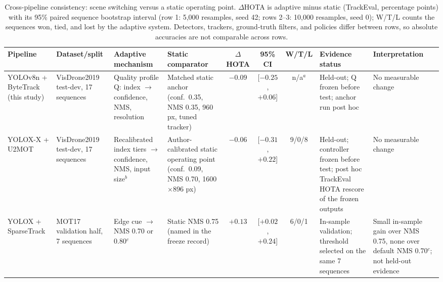 \begin{table}[t]
\centering
\caption{Cross-pipeline consistency: scene switching versus a static operating point. $\Delta$HOTA is adaptive minus static (TrackEval, percentage points) with its 95\% paired sequence bootstrap interval (row 1: 5,000 resamples, seed 42; rows 2--3: 10,000 resamples, seed 0); W/T/L counts the sequences won, tied, and lost by the adaptive system. Detectors, trackers, ground-truth filters, and policies differ between rows, so absolute accuracies are not comparable across rows.}
\label{tab:crosspipe}
\footnotesize
\setlength\tabcolsep{3pt}
\begin{tabular}{>{\raggedright\arraybackslash}p{1.6cm}>{\raggedright\arraybackslash}p{1.75cm}>{\raggedright\arraybackslash}p{1.9cm}>{\raggedright\arraybackslash}p{2.0cm}ccc>{\raggedright\arraybackslash}p{1.95cm}>{\raggedright\arraybackslash}p{1.6cm}}
\hline
Pipeline & Dataset/split & Adaptive mechanism & Static comparator & $\Delta$HOTA & 95\% CI & W/T/L & Evidence status & Interpretation \\
\hline
YOLOv8n + ByteTrack (this study) & VisDrone2019 test-dev, 17 sequences & Quality profile Q: index $\to$ confidence, NMS, resolution & Matched static anchor (conf.\ 0.35, NMS 0.35, 960 px, tuned tracker) & $-0.09$ & [$-0.25$, $+0.06$] & n/a$^{a}$ & Held-out; Q frozen before test; anchor run post hoc & No measurable change \\
YOLOX-X + U2MOT & VisDrone2019 test-dev, 17 sequences & Recalibrated index tiers $\to$ confidence, NMS, input size$^{b}$ & Author-calibrated static operating point (conf.\ 0.09, NMS 0.70, 1600$\times$896 px) & $-0.06$ & [$-0.31$, $+0.22$] & 9/0/8 & Held-out; controller frozen before test; post hoc TrackEval HOTA rescore of the frozen outputs & No measurable change \\
YOLOX + SparseTrack & MOT17 validation half, 7 sequences & Edge cue $\to$ NMS 0.70 or 0.80$^{c}$ & Static NMS 0.75 (named in the freeze record) & $+0.13$ & [$+0.02$, $+0.24$] & 6/0/1 & In-sample validation; threshold selected on the same 7 sequences & Small in-sample gain over NMS 0.75, none over default NMS 0.70$^{c}$; not held-out evidence \\
\hline
\end{tabular}


\end{table}
